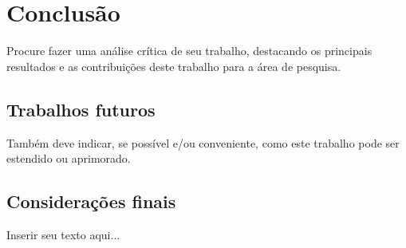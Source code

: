 
\chapter{Conclusão}
\label{chap_conclusao}

Procure fazer uma análise crítica de seu trabalho, destacando os principais resultados e as contribuições deste trabalho para a área de pesquisa.

\section{Trabalhos futuros}
\label{sec_trabalhos_futuros}

Também deve indicar, se possível e/ou conveniente, como este trabalho pode ser estendido ou aprimorado.

\section{Considerações finais}
\label{sec_consideracoes_finais}

Inserir seu texto aqui...

